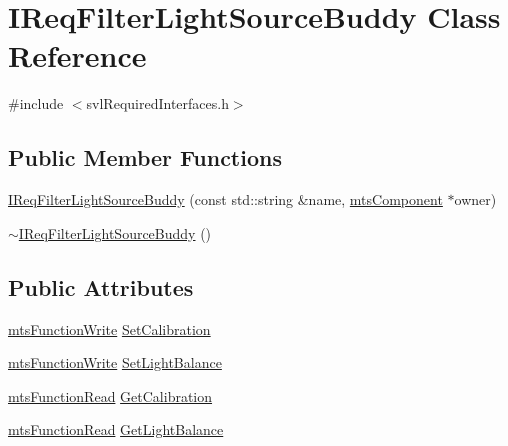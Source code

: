 \hypertarget{class_i_req_filter_light_source_buddy}{\section{I\-Req\-Filter\-Light\-Source\-Buddy Class Reference}
\label{class_i_req_filter_light_source_buddy}
}


{\ttfamily \#include $<$svl\-Required\-Interfaces.\-h$>$}

\subsection*{Public Member Functions}
\begin{DoxyCompactItemize}
\item 
\hyperlink{class_i_req_filter_light_source_buddy_acf3f813df1b310c77b6dab1199d1a1da}{I\-Req\-Filter\-Light\-Source\-Buddy} (const std\-::string \&name, \hyperlink{classmts_component}{mts\-Component} $\ast$owner)
\item 
\hyperlink{class_i_req_filter_light_source_buddy_a80ecde855ca1c8f8f622b3774c3d0448}{$\sim$\-I\-Req\-Filter\-Light\-Source\-Buddy} ()
\end{DoxyCompactItemize}
\subsection*{Public Attributes}
\begin{DoxyCompactItemize}
\item 
\hyperlink{classmts_function_write}{mts\-Function\-Write} \hyperlink{class_i_req_filter_light_source_buddy_a935725df98772111c6bb59934969bbad}{Set\-Calibration}
\item 
\hyperlink{classmts_function_write}{mts\-Function\-Write} \hyperlink{class_i_req_filter_light_source_buddy_a27a4cb9b757819473851dc8ba62e1241}{Set\-Light\-Balance}
\item 
\hyperlink{classmts_function_read}{mts\-Function\-Read} \hyperlink{class_i_req_filter_light_source_buddy_ad55805514f5fd65daffc97e1e0a17960}{Get\-Calibration}
\item 
\hyperlink{classmts_function_read}{mts\-Function\-Read} \hyperlink{class_i_req_filter_light_source_buddy_a02d7dd402542d60b0e2a8eab49ae0996}{Get\-Light\-Balance}
\end{DoxyCompactItemize}


